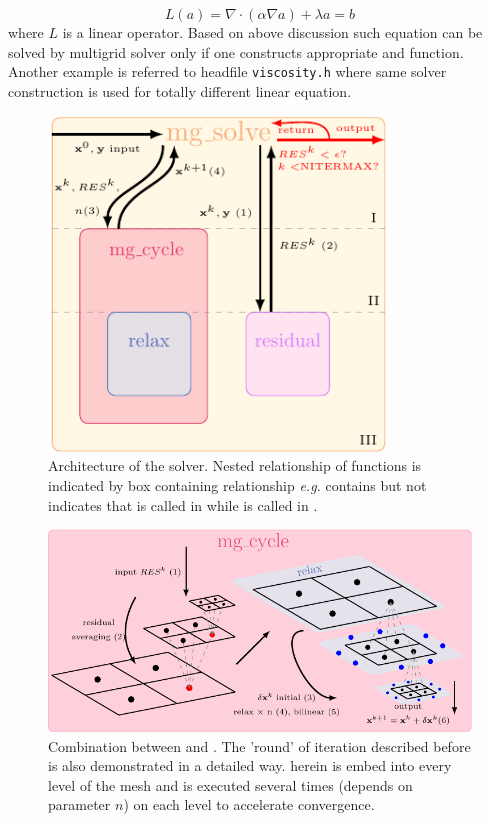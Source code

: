 \begin{equation}\label{equ:poisson-poisson}
  L(a)=\nabla\cdot(\alpha\nabla a) + \lambda a =b
\end{equation}
where $L$ is a linear operator. Based on above discussion such equation can be solved by multigrid solver only if one constructs appropriate  and  function. Another example is referred to headfile \texttt{viscosity.h} where same solver construction is used for totally different linear equation. 

\begin{figure}[H]
    \centering
    \includegraphics[width=0.8\textwidth]{./image/poisson-h/mgsolver}
    \caption{Architecture of the solver. Nested relationship of functions is indicated by box containing relationship \emph{e.g.}  contains  but not  indicates that  is called in  while  is called in .}
    \label{fig:poisson-workflow}
\end{figure}

\begin{figure}[H]
    \centering
    \includegraphics{./image/poisson-h/mgcycle}
    \caption{Combination between  and . The 'round' of iteration described before is also demonstrated in a detailed way.  herein is embed into every level of the mesh and is executed several times (depends on parameter $n$) on each level to accelerate convergence.}
    \label{fig:poisson-mgcycle}
\end{figure}

